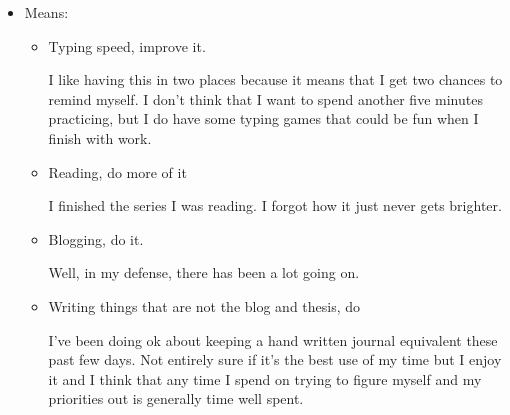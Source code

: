 \documentclass[12pt]{article}
\renewcommand{\,}{\textsuperscript{,}}
\begin{document}
\begin{itemize}
\begin{itemize}
\begin{itemize}
All this to say, tomorrow I'm planning on spending some time in my cage, and I think that it could be nice to write another letter or two.  
Probably just one, but I would also like to read the etiquette books to know what goes in them.  
Looking at the website for one of the guides\footnote{wild, can I just say. It feels very like 2020s aesthetic and then I read the content and it's fresh out of the mid 1900s}, it seems like generally one is just supposed to know what to put in a letter?  
Eh, I'll try something out and see how it goes.

\item Handwriting, pick and make the new one

I'm enjoying working with lower case letters again! I do still kind of feel like I don't have enough control to make each letter look identical and be spaced the same, and I do catch myself often going into cursive for a few letters or back to all capitals on a difficult word.

\end{itemize}

\item Means:

\begin{itemize}

\item Typing speed, improve it.

I like having this in two places because it means that I get two chances to remind myself. I don't think that I want to spend another five minutes practicing, but I do have some typing games that could be fun when I finish with work.

\item Reading, do more of it

I finished the series I was reading. I forgot how it just never gets brighter.

\item Blogging, do it.

Well, in my defense, there has been a lot going on.

\item Writing things that are not the blog and thesis, do

I've been doing ok about keeping a hand written journal equivalent these past few days.  
Not entirely sure if it's the best use of my time but I enjoy it and I think that any time I spend on trying to figure myself and my priorities out is generally time well spent.

\end{itemize}

\end{itemize}

\end{itemize}
\end{document}
